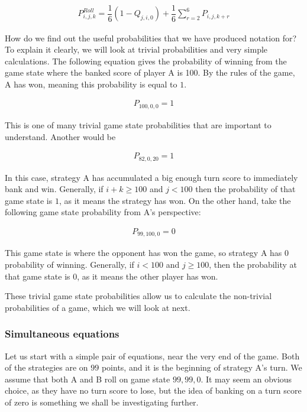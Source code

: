 \documentclass[a4paper,titlepage]{article}
\begin{document}
\begin{align*}
P^{Roll}_{i,j,k} = \dfrac{1}{6} (1-Q_{j,i,0}) + \dfrac{1}{6}\sum^{6}_{r=2}P_{i,j,k+r}
\end{align*}

How do we find out the useful probabilities that we have produced notation for? To explain it clearly, we will look at trivial probabilities and very simple calculations. The following equation gives the probability of winning from the game state where the banked score of player A is 100. By the rules of the game, A has won, meaning this probability is equal to $1$.

\begin{align*}
	P_{100,0,0}=1
\end{align*}

This is one of many trivial game state probabilities that are important to understand. Another would be

\begin{align*}
	P_{82,0,20}=1
\end{align*}

In this case, strategy A has accumulated a big enough turn score to immediately bank and win. Generally, if $i+k\geq100$ and $j<100$ then the probability of that game state is $1$, as it means the strategy has won. On the other hand, take the following game state probability from A's perspective:

\begin{align*}
	P_{99,100,0}=0
\end{align*}

This game state is where the opponent has won the game, so strategy A has $0$ probability of winning. Generally, if $i<100$ and $j\geq100$, then the probability at that game state is $0$, as it means the other player has won.

These trivial game state probabilities allow us to calculate the non-trivial probabilities of a game, which we will look at next.

\subsubsection{Simultaneous equations}
Let us start with a simple pair of equations, near the very end of the game. Both of the strategies are on $99$ points, and it is the beginning of strategy A's turn. We assume that both A and B roll on game state $99,99,0$. It may seem an obvious choice, as they have no turn score to lose, but the idea of banking on a turn score of zero is something we shall be investigating further.
\end{document}
